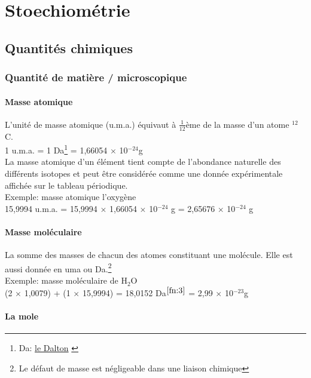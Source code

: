 \documentclass[10pt,a4paper]{book}
\begin{document}
\chapter{Stoechiométrie}

\section{Quantités chimiques}

\subsection{Quantité de matière / microscopique}

\subsubsection{Masse atomique}

L'unité de masse atomique (u.m.a.) équivaut à $ \frac{1}{12} $ème de la masse d'un atome $^{12}$C. \\ 
1 u.m.a. = 1 Da\footnote{Da: \href{https://fr.wikipedia.org/wiki/Unit\%C3\%A9_de_masse_atomique_unifi\%C3\%A9e\#En_biochimie}{le Dalton} \label{fn:3}} = 1,66054 $\times$ 10$^{-24}$g \\
La masse atomique d’un élément tient compte de l’abondance naturelle des différents isotopes et peut être considérée comme une donnée expérimentale affichée sur le tableau périodique.\\
Exemple: masse atomique l'oxygène \\
15,9994 u.m.a. = 15,9994 $\times$ 1,66054 $\times$ 10$^{-24}$ g = 2,65676 $\times$ 10$^{-24}$ g

\subsubsection{Masse moléculaire}

La somme des masses de chacun des atomes constituant une molécule. Elle est aussi donnée en uma ou Da.\footnote{Le défaut de masse est négligeable dans une liaison chimique}\\
Exemple: masse moléculaire de H$_2$O \\
(2 $\times$ 1,0079) + (1 $\times$ 15,9994) = 18,0152 Da$^{\ref{fn:3}}$ = 2,99 $\times$ 10$^{-23}$g

\subsubsection{La mole}
\end{document}
